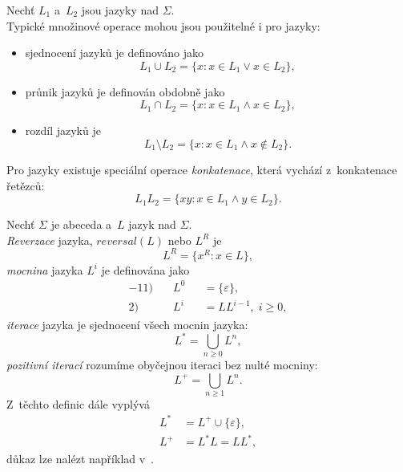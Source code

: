 \begin{definition}
    Nechť $L_1$ a~$L_2$ jsou jazyky nad $\Sigma$.\\
    Typické množinové operace mohou jsou použitelné i pro jazyky:
    \begin{itemize}
        \item sjednocení jazyků je definováno jako 
        \begin{equation*}
            L_1 \cup L_2 = \{x : x \in L_1 \vee x \in L_2\},
        \end{equation*}
        \item průnik jazyků je definován obdobně jako
        \begin{equation*}
            L_1 \cap L_2 = \{x : x \in L_1 \wedge x \in L_2\},
        \end{equation*}
        \item rozdíl jazyků je
        \begin{equation*}
            L_1 \setminus L_2 = \{x : x \in L_1 \wedge x \notin L_2\}.
        \end{equation*} 
    \end{itemize}
    Pro jazyky existuje speciální operace \emph{konkatenace}, která vychází z~konkatenace řetězců:
    \begin{equation*}
        L_1L_2 = \{xy : x \in L_1 \wedge y \in L_2\}.   
    \end{equation*} 
\end{definition}

\begin{definition}
    Nechť $\Sigma$ je abeceda a~$L$ jazyk nad $\Sigma$.\\
    \emph{Reverzace} jazyka, $reversal(L)$ nebo $L^R$ je
    \begin{equation*}
        L^R = \{x^R : x \in L\},
    \end{equation*}
    \emph{mocnina} jazyka $L^i$ je definována jako
    \begin{alignat*}{-1}
        \text{1)}& \quad L^0 &&= \{\varepsilon\},\\
        \text{2)}& \quad L^i &&= LL^{i-1},\; i \geq 0,
    \end{alignat*}
    \emph{iterace} jazyka je sjednocení všech mocnin jazyka:
    \begin{equation*}
        L^* = \bigcup_{n \geq 0} L^n,
    \end{equation*}
    \emph{pozitivní iterací} rozumíme obyčejnou iteraci bez nulté mocniny:
    \begin{equation*}
        L^+ = \bigcup_{n \geq 1} L^n.
    \end{equation*}
    Z~těchto definic dále vyplývá 
    \begin{align*}
        L^* &= L^+ \cup \{\varepsilon\},\\
        L^+ &= L^*L = LL^*,
    \end{align*}
    důkaz lze nalézt například v~\cite{TIN-opora}.
\end{definition}

